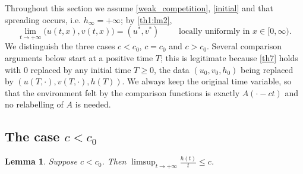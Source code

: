 \documentclass[reqno]{amsart}
\theoremstyle{plain}
\newtheorem{lemma}[theorem]{Lemma}
\theoremstyle{definition}
\theoremstyle{remark}
\begin{document}
Throughout this section we assume \eqref{weak_competition}, \eqref{initial} and
that spreading occurs, i.e. $h_\infty=+\infty$; by \cref{th1:lm2},
\begin{equation}\label{eq:spread_conv}
	\lim_{t\to+\infty}\big(u(t,x),v(t,x)\big)=(u^*,v^*)
	\qquad\text{ locally uniformly in }x\in[0,\infty).
\end{equation}
We distinguish the three cases $c<c_0$, $c=c_0$ and $c>c_0$. Several comparison
arguments below start at a positive time $T$; this is legitimate because
\cref{th7} holds with $0$ replaced by any initial time $T\ge0$, the data
$(u_0,v_0,h_0)$ being replaced by $(u(T,\cdot),v(T,\cdot),h(T))$. We always keep
the original time variable, so that the environment felt by the comparison
functions is exactly $A(\cdot-ct)$ and no relabelling of $A$ is needed.

\subsection{The case \texorpdfstring{$c<c_0$}{c<c0}}

\begin{lemma}\label{lem:limsup}
	Suppose $c < c_0$. Then $\displaystyle\limsup_{t \to +\infty} \frac{h(t)}{t} \le c$.
\end{lemma}
\end{document}
